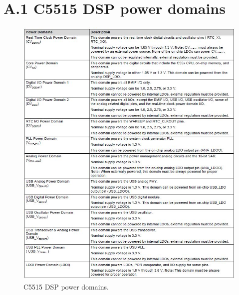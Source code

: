 
\appendix
\chapter{A.1 C5515 DSP power domains}

\begin{figure}[h]
	\centering
	\includegraphics[scale = 0.7 ]{power_domain.JPG}
	\caption{C5515 DSP power domains. \cite{appref}\label{power_domain}}
\end{figure}

